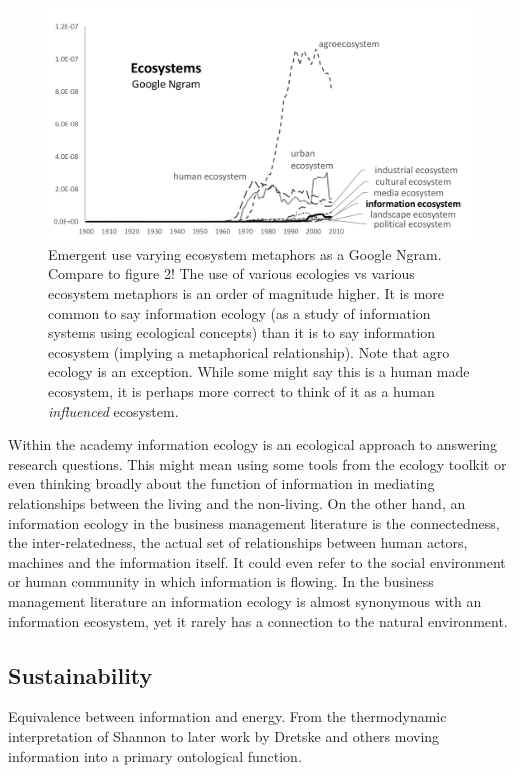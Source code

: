 \begin{figure}[!ht]
  \centering
    \includegraphics[width=1.0\textwidth]{figures/ecosystemsAll}
  \caption{Emergent use varying ecosystem metaphors as a Google Ngram. Compare to figure 2! The use of various ecologies vs various ecosystem metaphors is an order of magnitude higher. It is more common to say information ecology (as a study of information systems using ecological concepts) than it is to say information ecosystem (implying a metaphorical relationship). Note that agro ecology is an exception. While some might say this is a human made ecosystem, it is perhaps more correct to think of it as a human \textit{influenced} ecosystem.}
\end{figure}

Within the academy information ecology is an ecological approach to answering research questions. This might mean using some tools from the ecology toolkit or even thinking broadly about the function of information in mediating relationships between the living and the non-living. On the other hand, an information ecology in the business management literature is the connectedness, the inter-relatedness, the actual set of relationships between human actors, machines and the information itself. It could even refer to the social environment or human community in which information is flowing. In the business management literature an information ecology is almost synonymous with an information ecosystem, yet it rarely has a connection to the natural environment.

\subsection{Sustainability}

Equivalence between information and energy. From the thermodynamic interpretation of Shannon to later work by Dretske and others moving information into a primary ontological function.

